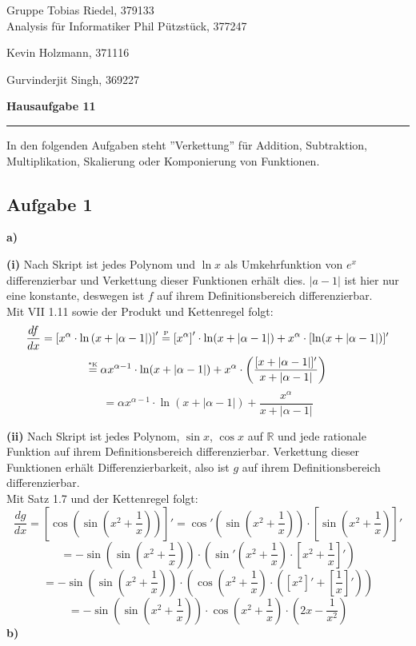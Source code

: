 \documentclass[a4paper,graphics,11pt]{article}
\newcommand{\aufgabe}[1]{\subsection*{Aufgabe #1}}
\newcommand{\up}[2]{\mathrel{\overset{\makebox[0pt]{\mbox{\normalfont\tiny #2}}}{#1}}}
\begin{document}
\noindent Gruppe              \hfill Tobias Riedel, 379133 \\
\noindent Analysis für Informatiker             \hfill Phil Pützstück, 377247 \\
\strut\hfill Kevin Holzmann, 371116\\
\strut\hfill Gurvinderjit Singh, 369227
\begin{center}
	\LARGE{\textbf{Hausaufgabe 11}}
\end{center}
\begin{center}
\rule[0.1ex]{\textwidth}{1pt}
\end{center}

In den folgenden Aufgaben steht ''Verkettung'' für Addition, Subtraktion, Multiplikation, Skalierung oder Komponierung
von Funktionen.

\aufgabe{1}
\textbf{a)}

\textbf{(i)}
Nach Skript ist jedes Polynom und $\ln x$ als Umkehrfunktion von $e^x$ differenzierbar und Verkettung dieser Funktionen erhält dies.
$|a-1|$ ist hier nur eine konstante, deswegen ist $f$ auf ihrem Definitionsbereich differenzierbar.\\
Mit VII 1.11 sowie der Produkt und Kettenregel folgt:
$$
    \frac{df}{dx} = \left[x^{\alpha} \cdot \ln\left(x+|\alpha-1|\right)\right]'
    \up{=}{P} \left[x^{\alpha}\right]'\cdot \ln(x+|\alpha-1|) + x^{\alpha} \cdot [\ln(x+|\alpha-1|)]'
$$$$
    \up{=}{*K} \alpha x^{\alpha-1}\cdot \ln(x+|\alpha-1|)
        + x^{\alpha} \cdot \left(\frac{[x+|\alpha-1|]'}{x+|\alpha-1|}\right)
$$$$
    = \alpha x^{\alpha-1}\cdot \ln(x+|\alpha-1|)
        +\frac{x^{\alpha}}{x+|\alpha-1|}
$$



\textbf{(ii)}
Nach Skript ist jedes Polynom, $\sin x$, $\cos x$ auf $\mathbb{R}$ und jede rationale Funktion auf ihrem
Definitionsbereich differenzierbar. Verkettung dieser Funktionen erhält Differenzierbarkeit, also ist $g$
auf ihrem Definitionsbereich differenzierbar.\\
Mit Satz 1.7 und der Kettenregel folgt:
$$
    \frac{dg}{dx} = \left[\cos\left(\sin\left(x^2+\frac{1}{x}\right)\right)\right]'
    = \cos'\left(\sin\left(x^2+\frac{1}{x}\right)\right)\cdot \left[\sin\left(x^2+\frac{1}{x}\right)\right]'
$$$$
    = -\sin\left(\sin\left(x^2+\frac{1}{x}\right)\right) \cdot \left(\sin'\left(x^2+\frac{1}{x}\right)\cdot\left[x^2+\frac{1}{x}\right]'\right)
$$$$
    = -\sin\left(\sin\left(x^2+\frac{1}{x}\right)\right) \cdot \left(\cos\left(x^2+\frac{1}{x}\right)\cdot\left(\left[x^2\right]'+\left[\frac{1}{x}\right]'\right)\right)
$$$$
    = -\sin\left(\sin\left(x^2+\frac{1}{x}\right)\right) \cdot \cos\left(x^2+\frac{1}{x}\right)\cdot\left(2x-\frac{1}{x^2}\right)
$$
\newpage
\textbf{b)}
\end{document}

